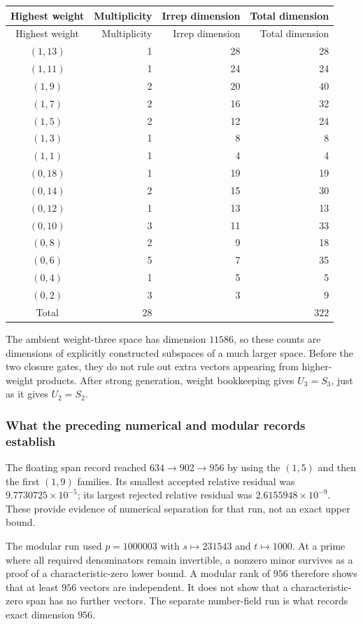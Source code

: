 \begin{longtable}{@{}crrr@{}}
\toprule Highest weight&Multiplicity&Irrep dimension&Total dimension\\\midrule\endfirsthead
\toprule Highest weight&Multiplicity&Irrep dimension&Total dimension\\\midrule\endhead
\bottomrule\endfoot
$(1,13)$ & 1 & 28 & 28\\
$(1,11)$ & 1 & 24 & 24\\
$(1,9)$ & 2 & 20 & 40\\
$(1,7)$ & 2 & 16 & 32\\
$(1,5)$ & 2 & 12 & 24\\
$(1,3)$ & 1 & 8 & 8\\
$(1,1)$ & 1 & 4 & 4\\
$(0,18)$ & 1 & 19 & 19\\
$(0,14)$ & 2 & 15 & 30\\
$(0,12)$ & 1 & 13 & 13\\
$(0,10)$ & 3 & 11 & 33\\
$(0,8)$ & 2 & 9 & 18\\
$(0,6)$ & 5 & 7 & 35\\
$(0,4)$ & 1 & 5 & 5\\
$(0,2)$ & 3 & 3 & 9\\
\midrule Total&$28$&&$322$\\
\end{longtable}
The ambient weight-three space has dimension $11586$, so these
counts are dimensions of explicitly constructed subspaces of a much
larger space. Before the two closure gates, they do not rule out extra
vectors appearing from higher-weight products. After strong generation,
weight bookkeeping gives $U_3=S_3$, just as it gives $U_2=S_2$.

\subsubsection{What the preceding numerical and modular records establish}

The floating span record reached $634\to902\to956$ by using the
$(1,5)$ and then the first $(1,9)$ families. Its smallest accepted
relative residual was $9.7730725\times10^{-5}$; its largest rejected
relative residual was $2.6155948\times10^{-9}$. These provide evidence
of numerical separation for that run, not an exact upper bound.

The modular run used $p=1000003$ with
$s\mapsto231543$ and $t\mapsto1000$. At a prime where all required
denominators remain invertible, a nonzero minor survives as a proof of
a characteristic-zero lower bound. A modular rank of $956$ therefore
shows that at least $956$ vectors are independent. It does not show
that a characteristic-zero span has no further vectors. The separate
number-field run is what records exact dimension $956$.

